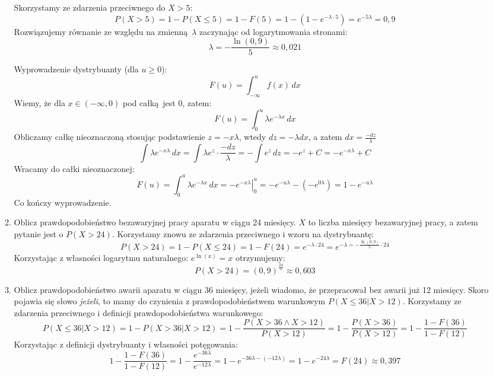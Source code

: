 \documentclass[twoside]{mwart}
\newcommand{\ans}[1]{}
\newenvironment{ansenv}{\comment}{\endcomment}
\newenvironment{ansenv}{\paragraph{Odpowiedź:}}{}
\newcommand{\ans}[1]{\begin{ansenv}#1\end{ansenv}}
\begin{document}
\begin{enumerate}
\begin{enumerate}
\begin{ansenv}
	Skorzystamy ze zdarzenia przeciwnego do $X>5$:
	\[ P(X>5)=1-P(X\leq 5)=1-F(5) = 1-\left(1-e^{-\lambda\cdot 5}\right) = e^{-5\lambda} = 0{,}9 \]
	Rozwiązujemy równanie ze względu na zmienną $\lambda$ zaczynając od logarytmowania stronami:
	\[ \lambda = -\frac{\ln(0{,}9)}{5} \approx 0{,}021 \]
	
	Wyprowadzenie dystrybuanty (dla $u\geq 0$):
	\[ F(u) = \int_{-\infty}^u f(x)\, dx \]
	Wiemy, że dla $x\in(-\infty,0)$ pod całką jest 0, zatem:
	\[ F(u) = \int_0^u \lambda e^{-\lambda x}\, dx \]
	Obliczamy całkę nieoznaczoną stosując podstawienie $z=-x\lambda$, wtedy $dz=-\lambda dx$, a zatem $dx=\frac{-dz}{\lambda}$
	\[ \int \lambda e^{-x\lambda}\, dx = \int \lambda e^z\cdot\frac{-dz}{\lambda} = -\int e^z\, dz = -e^z + C = -e^{-x\lambda} +C \]
	Wracamy do całki nieoznaczonej:
	\[ F(u) = \int_0^u \lambda e^{-\lambda x}\, dx = \left. -e^{-x\lambda} \right|_0^u = -e^{-u\lambda} - \left(-e^{0\lambda}\right) = 1-e^{-u\lambda} \]
	Co kończy wyprowadzenie.
\end{ansenv}
\item Oblicz prawdopodobieństwo bezawaryjnej pracy aparatu w ciągu 24 miesięcy.
\begin{ansenv}
	$X$ to liczba miesięcy bezawaryjnej pracy, a zatem pytanie jest o $P(X>24)$.
	Korzystamy znowu ze zdarzenia przeciwnego i wzoru na dystrybuantę:
	\[ P(X>24) = 1-P(X\leq 24)=1-F(24) = e^{-\lambda\cdot 24} = e^{-\lambda = -\frac{\ln(0{,}9)}{5}\cdot 24} \]
	Korzystając z własności logarytmu naturalnego: $e^{\ln(x)} = x$ otrzymujemy:
	\[ P(X>24) = \left(0{,}9\right)^\frac{24}{5} \approx 0{,}603 \]
\end{ansenv}
\item Oblicz prawdopodobieństwo awarii aparatu w ciągu 36 miesięcy, jeżeli wiadomo, że przepracował bez awarii już 12 miesięcy. %
\begin{ansenv}
	Skoro pojawia się słowo \emph{jeżeli}, to mamy do czynienia z prawdopodobieństwem warunkowym $P(X\leq 36|X>12)$. Korzystamy ze zdarzenia przeciwnego i definicji prawdopodobieństwa warunkowego:
	\[ P(X\leq 36|X>12) = 1-P(X>36|X>12) = 1-\frac{P(X>36 \land X>12)}{P(X>12)} = 1-\frac{P(X>36)}{P(X>12)} = 1-\frac{1-F(36)}{1-F(12)} \]
	Korzystając z definicji dystrybuanty i własności potęgowania:
	\[ 1-\frac{1-F(36)}{1-F(12)} = 1-\frac{e^{-36\lambda}}{e^{-12\lambda}} = 1-e^{-36\lambda-(-12\lambda)} = 1-e^{-24\lambda} = F(24) \approx 0{,}397 \]
	

\end{ansenv}
\end{enumerate}
\end{enumerate}
\end{document}
